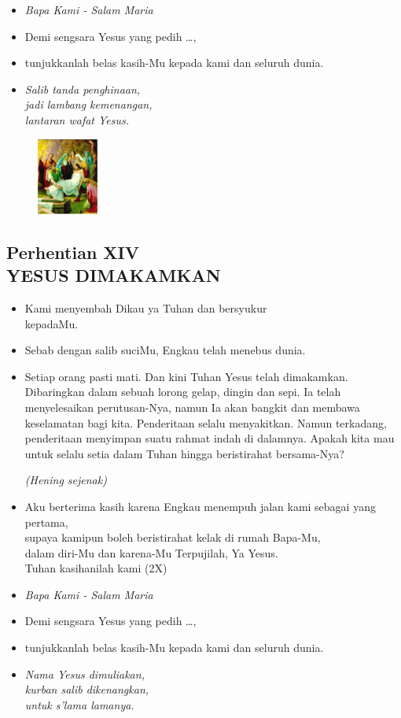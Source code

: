 \documentclass[a5paper,headsepline,titlepage,11pt,nnormalheadings,DIVcalc]{scrbook}
\newcommand{\BU}[1]{\begin{itemize} \item[U:] #1 \end{itemize}}
\newcommand{\BP}[1]{\begin{itemize} \item[P:] #1 \end{itemize}}
\newcommand{\kamiMenyembah}{\BP{ Kami menyembah Dikau ya Tuhan dan bersyukur\\kepadaMu.}
\BU{ Sebab dengan salib suciMu, Engkau telah menebus dunia.}
}
\newcommand{\kasihanilahKami}{\BP{Demi sengsara Yesus yang pedih \ldots,}
\BU{tunjukkanlah belas kasih-Mu kepada kami dan seluruh dunia.}}
\def\hening{\par \textit{(Hening sejenak)}}
\begin{document}
\large\begin{itemize}\item[~]\it{Bapa Kami - Salam Maria}\end{itemize}\normalsize
\kasihanilahKami

\begin{itemize}
\item[14.] \it{Salib tanda penghinaan,\\
	jadi lambang kemenangan,\\
	lantaran wafat Yesus.}
\end{itemize}

\begin{figure}
\includegraphics[width=2cm]{jalansalib_files/14_small.jpg}
\end{figure}
\subsection*{Perhentian XIV\\
YESUS DIMAKAMKAN}

\kamiMenyembah

\BP{Setiap orang pasti mati. Dan kini Tuhan Yesus telah dimakamkan. Dibaringkan dalam sebuah lorong gelap, dingin dan sepi. Ia telah menyelesaikan perutusan-Nya, namun Ia akan bangkit dan membawa keselamatan bagi kita. Penderitaan selalu menyakitkan. Namun terkadang, penderitaan menyimpan suatu rahmat indah di dalamnya. Apakah kita mau untuk selalu setia dalam Tuhan hingga beristirahat bersama-Nya?
\hening
}

\BU{Aku berterima kasih karena Engkau menempuh jalan kami sebagai yang pertama,\\ supaya kamipun boleh beristirahat kelak di rumah Bapa-Mu,\\ dalam diri-Mu dan karena-Mu Terpujilah, Ya Yesus.\\
Tuhan kasihanilah kami (2X)   
}

\large\begin{itemize}\item[~]\it{Bapa Kami - Salam Maria}\end{itemize}\normalsize
\kasihanilahKami

\begin{itemize}
\item[15.] \it{Nama Yesus dimuliakan,\\
	kurban salib dikenangkan,\\
	untuk s’lama lamanya.}
\end{itemize}
\end{document}
